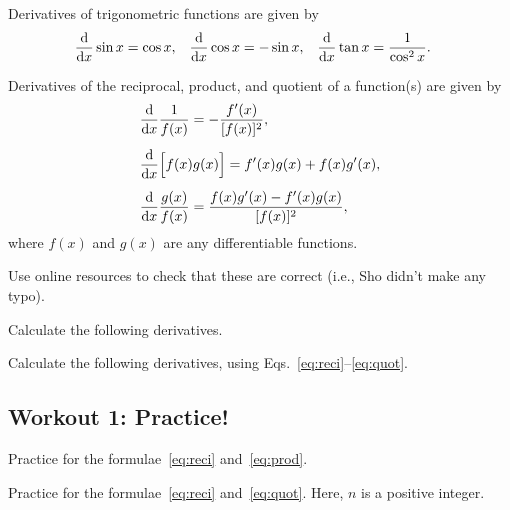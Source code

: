 \documentclass[11pt,pdfa,lastpage]{MishoNote}
\begin{document}
\begin{theorem}{}{}
  Derivatives of trigonometric functions are given by
  \begin{align}
   \diff{}{x}\sin x &= \cos x,&
   \diff{}{x}\cos x &= -\sin x,&
   \diff{}{x}\tan x &= \frac1{\cos^2x}.
  \end{align}
\end{theorem}
\begin{theorem}{}{}
  Derivatives of the reciprocal, product, and quotient of a function(s) are given by
  \begin{align}
   &\label{eq:reci} \diff{}{x}\frac{1}{f(x)}=-\frac{f'(x)}{[f(x)]^2},\\[0.5em]
   &\label{eq:prod} \diff{}{x}\Bigl[f(x)g(x)\Bigr]=f'(x)g(x)+f(x)g'(x),\\[0.5em]
   &\label{eq:quot} \diff{}{x}\frac{g(x)}{f(x)}=\frac{f(x)g'(x)-f'(x)g(x)}{[f(x)]^2},
   \end{align}
   where  $f(x)$ and $g(x)$ are any differentiable functions.
\end{theorem}

\begin{problems}
  \Problem[S]
  Use online resources to check that these are correct (i.e., Sho didn't make any typo).
\end{problems}
\begin{problems}
  \Problem[S] Calculate the following derivatives.
  \begin{menumerate}{3}
  \end{menumerate}
  \Problem[S] Calculate the following derivatives, using Eqs.~\eqref{eq:reci}--\eqref{eq:quot}.
  \begin{menumerate}{3}
  \end{menumerate}
\end{problems}

\subsection{Workout 1: Practice!}
\begin{problems}
\Problem[S] Practice for the formulae~\eqref{eq:reci} and~\eqref{eq:prod}.
\begin{menumerate}{3}
\end{menumerate}
\Problem[S] Practice for the formulae~\eqref{eq:reci} and~\eqref{eq:quot}. Here, $n$ is a positive integer.
\begin{menumerate}{4}
\end{menumerate}
\end{problems}
\end{document}
